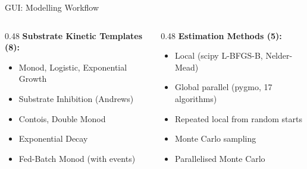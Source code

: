 \documentclass[aspectratio=169, 11pt]{beamer}
\begin{document}
\begin{frame}{GUI: Modelling Workflow}
  \vspace{0.2cm}
  \begin{columns}[T]
    \begin{column}{0.48\textwidth}
      \textbf{Substrate Kinetic Templates (8):}
      {\small
      \begin{itemize}
        \item Monod, Logistic, Exponential Growth
        \item Substrate Inhibition (Andrews)
        \item Contois, Double Monod
        \item Exponential Decay
        \item Fed-Batch Monod (with events)
      \end{itemize}
      }
    \end{column}
    \begin{column}{0.48\textwidth}
      \textbf{Estimation Methods (5):}
      {\small
      \begin{itemize}
        \item Local (scipy L-BFGS-B, Nelder-Mead)
        \item Global parallel (pygmo, 17 algorithms)
        \item Repeated local from random starts
        \item Monte Carlo sampling
        \item Parallelised Monte Carlo
      \end{itemize}
      }
    \end{column}
  \end{columns}
\end{frame}
\end{document}
